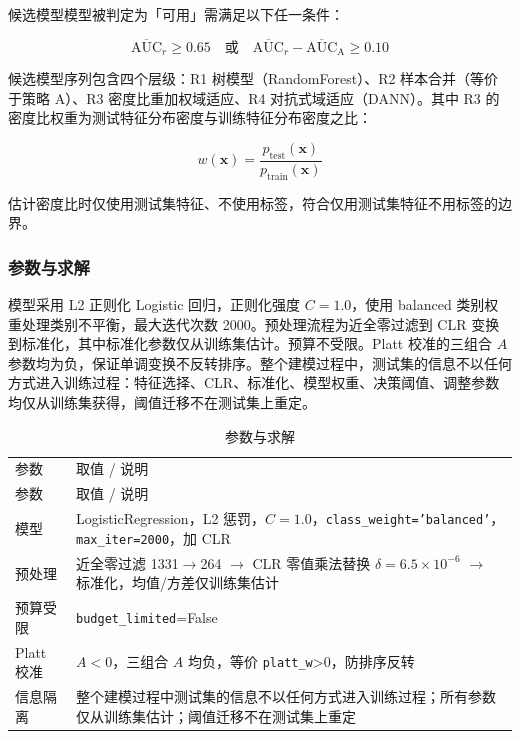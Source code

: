 \documentclass{../../latex/templates/mcm-paper}
\begin{document}
候选模型模型被判定为「可用」需满足以下任一条件：

\begin{equation}
\overline{\mathrm{AUC}}_r \ge 0.65 \quad \text{或} \quad \overline{\mathrm{AUC}}_r - \overline{\mathrm{AUC}}_{\mathrm{A}} \ge 0.10
\label{eq:s3-usable-line}
\end{equation}

候选模型序列包含四个层级：R1 树模型（RandomForest）、R2 样本合并（等价于策略 A）、R3 密度比重加权域适应、R4 对抗式域适应（DANN）。其中 R3 的密度比权重为测试特征分布密度与训练特征分布密度之比：

\begin{equation}
w(\mathbf{x}) = \frac{p_{\mathrm{test}}(\mathbf{x})}{p_{\mathrm{train}}(\mathbf{x})}
\label{eq:s3-importance}
\end{equation}

估计密度比时仅使用测试集特征、不使用标签，符合仅用测试集特征不用标签的边界。

\subsubsection{参数与求解}

模型采用 L2 正则化 Logistic 回归，正则化强度 $C=1.0$，使用 balanced 类别权重处理类别不平衡，最大迭代次数 2000。预处理流程为近全零过滤到 CLR 变换到标准化，其中标准化参数仅从训练集估计。预算不受限。Platt 校准的三组合 $A$ 参数均为负，保证单调变换不反转排序。整个建模过程中，测试集的信息不以任何方式进入训练过程：特征选择、CLR、标准化、模型权重、决策阈值、调整参数均仅从训练集获得，阈值迁移不在测试集上重定。

{\small
\begin{longtable}{>{\centering\arraybackslash}p{}>{\centering\arraybackslash}p{}}
\arrayrulecolor[gray]{0.8}
\caption{参数与求解}\label{tab:s3-params}\\
\toprule
参数 & 取值 / 说明 \\
\midrule
\endfirsthead
\toprule
参数 & 取值 / 说明 \\
\midrule
\endhead
\bottomrule
\endlastfoot
模型 & LogisticRegression，L2 惩罚，$C=1.0$，\texttt{class\_weight='balanced'}，\texttt{max\_iter=2000}，加 CLR \\
\hline
预处理 & 近全零过滤 1331$\to$264 $\to$ CLR 零值乘法替换 $\delta=6.5\times10^{-6}$ $\to$ 标准化，均值/方差仅训练集估计 \\
\hline
预算受限 & \texttt{budget\_limited}=False \\
\hline
Platt 校准 & $A<0$，三组合 $A$ 均负，等价 \texttt{platt\_w}>0，防排序反转 \\
\hline
信息隔离 & 整个建模过程中测试集的信息不以任何方式进入训练过程；所有参数仅从训练集估计；阈值迁移不在测试集上重定 \\
\end{longtable}
}
\end{document}
